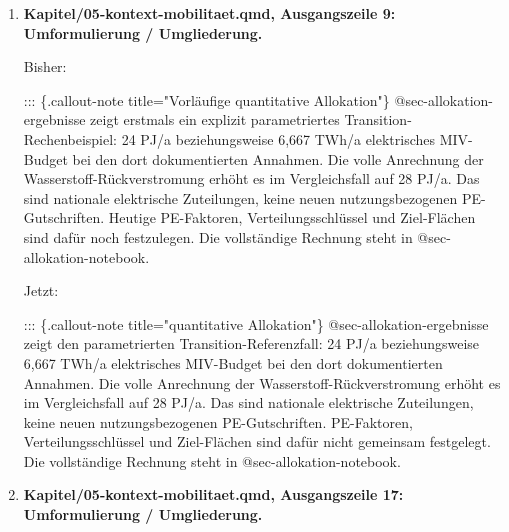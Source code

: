 \documentclass[
  ngerman,
  a4paper,
  DIV=11]{scrreprt}
\newenvironment{Shaded}{\begin{snugshade}}{\end{snugshade}}
\newcommand{\NormalTok}[1]{\textcolor[rgb]{0.00,0.23,0.31}{#1}}
\begin{document}
\begin{enumerate}
  Jetzt:

\begin{Shaded}
\begin{Highlighting}[]
\NormalTok{Die ursprüngliche Kalibrierung verwendete fünf energetische Gebäudeklassen und eine spezifische Dichtefunktion [@schneider2023context]. Diese historische Lösung erläutert die Entstehung der Methode, ersetzt aber weder die neuen Typologien noch die Kalibrierung mit UBA Transition 2040.}
\end{Highlighting}
\end{Shaded}
\item
  \textbf{Kapitel/05-kontext-mobilitaet.qmd, Ausgangszeile 9:
  Umformulierung / Umgliederung.}

  Bisher:

\begin{Shaded}
\begin{Highlighting}[]
\NormalTok{::: \{.callout{-}note title="Vorläufige quantitative Allokation"\}}
\NormalTok{@sec{-}allokation{-}ergebnisse zeigt erstmals ein explizit parametriertes Transition{-}Rechenbeispiel: 24 PJ/a beziehungsweise 6,667 TWh/a elektrisches MIV{-}Budget bei den dort dokumentierten Annahmen. Die volle Anrechnung der Wasserstoff{-}Rückverstromung erhöht es im Vergleichsfall auf 28 PJ/a. Das sind nationale elektrische Zuteilungen, keine neuen nutzungsbezogenen PE{-}Gutschriften. Heutige PE{-}Faktoren, Verteilungsschlüssel und Ziel{-}Flächen sind dafür noch festzulegen. Die vollständige Rechnung steht in @sec{-}allokation{-}notebook.}
\end{Highlighting}
\end{Shaded}

  Jetzt:

\begin{Shaded}
\begin{Highlighting}[]
\NormalTok{::: \{.callout{-}note title="quantitative Allokation"\}}
\NormalTok{@sec{-}allokation{-}ergebnisse zeigt den parametrierten Transition{-}Referenzfall: 24 PJ/a beziehungsweise 6,667 TWh/a elektrisches MIV{-}Budget bei den dort dokumentierten Annahmen. Die volle Anrechnung der Wasserstoff{-}Rückverstromung erhöht es im Vergleichsfall auf 28 PJ/a. Das sind nationale elektrische Zuteilungen, keine neuen nutzungsbezogenen PE{-}Gutschriften. PE{-}Faktoren, Verteilungsschlüssel und Ziel{-}Flächen sind dafür nicht gemeinsam festgelegt. Die vollständige Rechnung steht in @sec{-}allokation{-}notebook.}
\end{Highlighting}
\end{Shaded}
\item
  \textbf{Kapitel/05-kontext-mobilitaet.qmd, Ausgangszeile 17:
  Umformulierung / Umgliederung.}


\end{enumerate}
\end{document}
